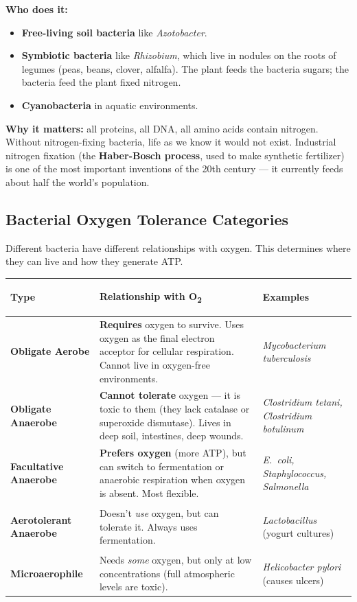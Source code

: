\documentclass[11pt, letterpaper]{article}
\begin{document}
\textbf{Who does it:}
\begin{itemize}[noitemsep]
  \item \textbf{Free-living soil bacteria} like \textit{Azotobacter}.
  \item \textbf{Symbiotic bacteria} like \textit{Rhizobium}, which live in nodules on the roots of legumes (peas, beans, clover, alfalfa). The plant feeds the bacteria sugars; the bacteria feed the plant fixed nitrogen.
  \item \textbf{Cyanobacteria} in aquatic environments.
\end{itemize}

\textbf{Why it matters:} all proteins, all DNA, all amino acids contain nitrogen. Without
nitrogen-fixing bacteria, life as we know it would not exist. Industrial nitrogen fixation
(the \textbf{Haber-Bosch process}, used to make synthetic fertilizer) is one of the most
important inventions of the 20th century --- it currently feeds about half the world's
population.

\subsection*{Bacterial Oxygen Tolerance Categories}

Different bacteria have different relationships with oxygen. This determines where they
can live and how they generate ATP.

\noindent
{\renewcommand{\arraystretch}{1.6}
\begin{tabularx}{\textwidth}{>{\bfseries\raggedright\arraybackslash}p{4cm}
                              >{\raggedright\arraybackslash}X
                              >{\raggedright\arraybackslash}p{3cm}}
\toprule
\rowcolor{tableheaderorange}
\textbf{Type} & \textbf{Relationship with O\textsubscript{2}} & \textbf{Examples} \\
\midrule
\rowcolor{rowOr} \textbf{Obligate Aerobe} & \textbf{Requires} oxygen to survive. Uses oxygen as the final electron acceptor for cellular respiration. Cannot live in oxygen-free environments. & \textit{Mycobacterium tuberculosis} \\
\rowcolor{rowA}  \textbf{Obligate Anaerobe} & \textbf{Cannot tolerate} oxygen --- it is toxic to them (they lack catalase or superoxide dismutase). Lives in deep soil, intestines, deep wounds. & \textit{Clostridium tetani, Clostridium botulinum} \\
\rowcolor{rowOr} \textbf{Facultative Anaerobe} & \textbf{Prefers oxygen} (more ATP), but can switch to fermentation or anaerobic respiration when oxygen is absent. Most flexible. & \textit{E.\ coli, Staphylococcus, Salmonella} \\
\rowcolor{rowA}  \textbf{Aerotolerant Anaerobe} & Doesn't \emph{use} oxygen, but can tolerate it. Always uses fermentation. & \textit{Lactobacillus} (yogurt cultures) \\
\rowcolor{rowOr} \textbf{Microaerophile} & Needs \emph{some} oxygen, but only at low concentrations (full atmospheric levels are toxic). & \textit{Helicobacter pylori} (causes ulcers) \\
\bottomrule
\end{tabularx}}
\end{document}
